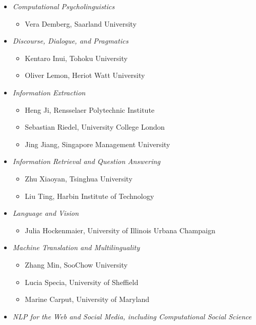 \begin{itemize}[itemsep=7pt, leftmargin=0cm, label={}]
\begin{itemize}[leftmargin=0.5cm, itemsep=6pt, label={}]
\item \emph{Computational Psycholinguistics}

\begin{itemize}[nosep, leftmargin=0.5cm, label={}]
\item Vera Demberg, Saarland University
\end{itemize}
\item \emph{Discourse, Dialogue, and Pragmatics}

\begin{itemize}[nosep, leftmargin=0.5cm, label={}]
\item Kentaro Inui, Tohoku University
\item Oliver Lemon, Heriot Watt University
\end{itemize}
\item \emph{Information Extraction}

\begin{itemize}[nosep, leftmargin=0.5cm, label={}]
\item Heng Ji, Rensselaer Polytechnic Institute
\item Sebastian Riedel, University College London
\item Jing Jiang, Singapore Management University
\end{itemize}
\item \emph{Information Retrieval and Question Answering}

\begin{itemize}[nosep, leftmargin=0.5cm, label={}]
\item Zhu Xiaoyan, Tsinghua University
\item Liu Ting, Harbin Institute of Technology
\end{itemize}
\item \emph{Language and Vision}

\begin{itemize}[nosep, leftmargin=0.5cm, label={}]
\item Julia Hockenmaier, University of Illinois Urbana Champaign
\end{itemize}
\item \emph{Machine Translation and Multilinguality}

\begin{itemize}[nosep, leftmargin=0.5cm, label={}]
\item Zhang Min, SooChow University
\item Lucia Specia, University of Sheffield
\item Marine Carput, University of Maryland
\end{itemize}
\item \emph{NLP for the Web and Social Media, including Computational Social
Science}


\end{itemize}
\end{itemize}
